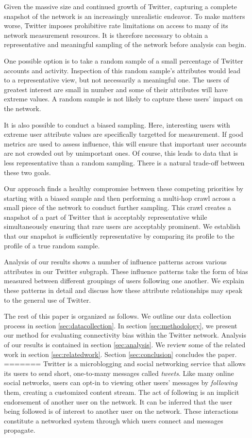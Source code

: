 Given the massive size and continued growth of Twitter, capturing a complete snapshot of the network is an increasingly unrealistic endeavor.  To make matters worse, Twitter imposes prohibitive rate limitations on access to many of its network measurement resources.  It is therefore necessary to obtain a representative and meaningful sampling of the network before analysis can begin.

One possible option is to take a random sample of a small percentage of Twitter accounts and activity.  Inspection of this random sample's attributes would lead to a representative view, but not necessarily a meaningful one.  The users of greatest interest are small in number and some of their attributes will have extreme values.  A random sample is not likely to capture these users' impact on the network.

It is also possible to conduct a biased sampling.  Here, interesting users with extreme user attribute values are specifically targetted for measurement.  If good metrics are used to assess influence, this will ensure that important user accounts are not crowded out by unimportant ones.  Of course, this leads to data that is less representative than a random sampling.  There is a natural trade-off between these two goals.

Our approach finds a healthy compromise between these competing priorities by starting with a biased sample and then performing a multi-hop crawl across a small piece of the network to conduct further sampling.  This crawl creates a snapshot of a part of Twitter that is acceptably representative while simultaneously ensuring that rare users are acceptably prominent.  We establish that our snapshot is sufficiently representative by comparing its profile to the profile of a true random sample.

Analysis of our results shows a number of influence patterns across various attributes in our Twitter subgraph.  These influence patterns take the form of bias measured between different groupings of users following one another.  We explain these patterns in detail and discuss how these attribute relationships may speak to the general use of Twitter.

The rest of this paper is organized as follows.  We outline our data collection process in section \ref{sec:datacollection}.  In section \ref{sec:methodology}, we present our method for evaluating connectivity bias within the Twitter network.  Analysis of our results is contained in section \ref{sec:analysis}.  We review some of the related work in section \ref{sec:relatedwork}.  Section \ref{sec:conclusion} concludes the paper.
=======
Twitter is a microblogging and social networking service that allows its users to send short, one-to-many messages called \textit{tweets}.  Like many online social 
networks, users can opt-in to viewing other users' messages by \textit{following} them, creating a customized content stream.  The act of following is an implicit 
endorsement of another user on the network.  It can be inferred that the user being followed is of interest to another user on the network.  These interactions 
constitute a networked system through which users connect and messages propagate.

